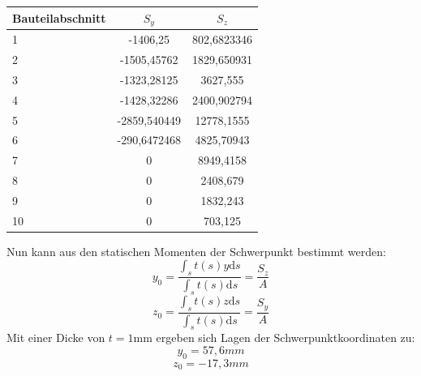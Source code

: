\begin{center}
\begin{tabular}[h]{l|c|c}
	
Bauteilabschnitt&$S_{y}$&$S_{z}$\\
\hline
1& -1406,25&802,6823346\\
2&-1505,45762&1829,650931\\
3&-1323,28125&3627,555\\
4&-1428,32286&2400,902794\\
5&-2859,540449&12778,1555\\
6&-290,6472468&4825,70943\\
7&0&8949,4158\\
8&0&2408,679\\
9&0&1832,243\\
10&0&703,125\\
\end{tabular}
\end{center}

\noindent Nun kann aus den statischen Momenten der Schwerpunkt bestimmt werden:
\begin{equation}
	y_{0}=\frac{\int_{s}{}t(s)y\mathrm{d}s}{\int_{s}{}t(s)\mathrm{d}s}=\frac{S_{z}}{A}
\end{equation}
\begin{equation}
	z_{0}=\frac{\int_{s}{}t(s)z\mathrm{d}s}{\int_{s}{}t(s)\mathrm{d}s}=\frac{S_{y}}{A}
\end{equation}
Mit einer Dicke von $t=1\mathrm{mm}$ ergeben sich Lagen der Schwerpunktkoordinaten zu:
\begin{equation}
	y_{0}=57,6mm
\end{equation}
\begin{equation}
	z_{0}=-17,3mm
\end{equation}

